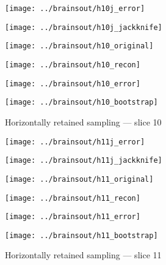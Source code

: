 \documentclass[review,supplement,onefignum,onetabnum,juq]{siamonline181217}
\begin{document}
\begin{figure}
\begin{centering}

\parbox{\imsize}{\texttt{[image: ../brainsout/h10j\_error]}}
\parbox{\imsize}{\texttt{[image: ../brainsout/h10j\_jackknife]}}

\vspace{\vertsep}

\parbox{\imsize}{\texttt{[image: ../brainsout/h10\_original]}}
\parbox{\imsize}{\texttt{[image: ../brainsout/h10\_recon]}}

\vspace{\vertsep}

\parbox{\imsize}{\texttt{[image: ../brainsout/h10\_error]}}
\parbox{\imsize}{\texttt{[image: ../brainsout/h10\_bootstrap]}}

\end{centering}
\caption{Horizontally retained sampling --- slice 10}
\end{figure}


\begin{figure}
\begin{centering}

\parbox{\imsize}{\texttt{[image: ../brainsout/h11j\_error]}}
\parbox{\imsize}{\texttt{[image: ../brainsout/h11j\_jackknife]}}

\vspace{\vertsep}

\parbox{\imsize}{\texttt{[image: ../brainsout/h11\_original]}}
\parbox{\imsize}{\texttt{[image: ../brainsout/h11\_recon]}}

\vspace{\vertsep}

\parbox{\imsize}{\texttt{[image: ../brainsout/h11\_error]}}
\parbox{\imsize}{\texttt{[image: ../brainsout/h11\_bootstrap]}}

\end{centering}
\caption{Horizontally retained sampling --- slice 11}
\end{figure}
\end{document}
